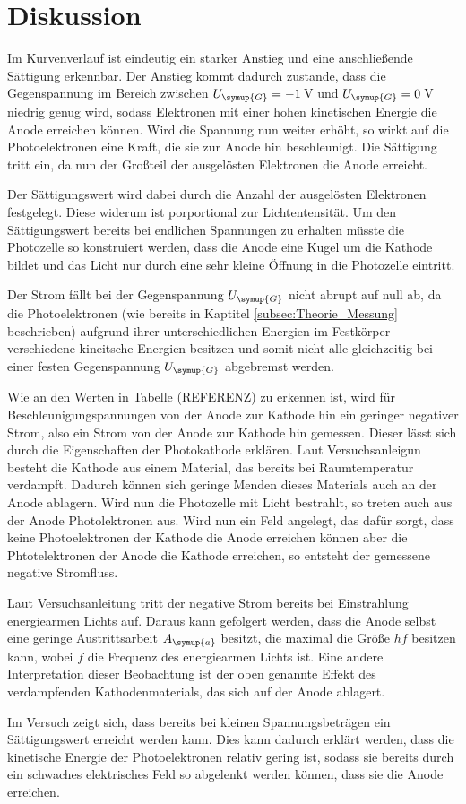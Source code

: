 \section{Diskussion}
\label{sec:Diskussion}

Im Kurvenverlauf ist eindeutig ein starker Anstieg und eine anschließende
Sättigung erkennbar. Der Anstieg kommt dadurch zustande, dass die Gegenspannung
im Bereich zwischen $U_{\symup{G}}=-1\,$V und $U_{\symup{G}}=0\,$V niedrig genug
wird, sodass Elektronen mit einer hohen kinetischen Energie die Anode erreichen
können. Wird die Spannung nun weiter erhöht, so wirkt auf die Photoelektronen
eine Kraft, die sie zur Anode hin beschleunigt. Die Sättigung tritt ein, da
nun der Großteil der ausgelösten Elektronen die Anode erreicht.

Der Sättigungswert wird dabei durch die Anzahl der ausgelösten Elektronen
festgelegt. Diese widerum ist porportional zur Lichtentensität.
Um den Sättigungswert bereits bei endlichen Spannungen zu erhalten müsste die
Photozelle so konstruiert werden, dass die Anode eine Kugel um die Kathode bildet
und das Licht nur durch eine sehr kleine Öffnung in die Photozelle eintritt.

Der Strom fällt bei der Gegenspannung $U_{\symup{G}}$ nicht abrupt auf null ab,
da die Photoelektronen (wie bereits in Kaptitel \ref{subsec:Theorie_Messung}
beschrieben) aufgrund ihrer unterschiedlichen Energien im Festkörper
verschiedene kineitsche Energien besitzen und somit nicht alle gleichzeitig
bei einer festen Gegenspannung $U_{\symup{G}}$ abgebremst werden.

Wie an den Werten in Tabelle (REFERENZ) zu erkennen ist, wird für Beschleunigungspannungen
von der Anode zur Kathode hin ein geringer negativer Strom, also ein Strom von
der Anode zur Kathode hin gemessen. Dieser lässt sich durch die Eigenschaften der
Photokathode erklären. Laut Versuchsanleigun \cite{Versuchsanleitung} besteht die
Kathode aus einem Material, das bereits bei Raumtemperatur verdampft. Dadurch können
sich geringe Menden dieses Materials auch an der Anode ablagern. Wird nun die
Photozelle mit Licht bestrahlt, so treten auch aus der Anode Photolektronen aus.
Wird nun ein Feld angelegt, das dafür sorgt, dass keine Photoelektronen der Kathode
die Anode erreichen können aber die Phtotelektronen der Anode die Kathode erreichen,
so entsteht der gemessene negative Stromfluss.

Laut Versuchsanleitung \cite{Versuchsanleitung} tritt der negative Strom bereits
bei Einstrahlung energiearmen Lichts auf. Daraus kann gefolgert werden, dass die
Anode selbst eine geringe Austrittsarbeit $A_{\symup{a}}$ besitzt, die maximal die
Größe $hf$ besitzen kann, wobei $f$ die Frequenz des energiearmen Lichts ist.
Eine andere Interpretation dieser Beobachtung ist der oben genannte Effekt des
verdampfenden Kathodenmaterials, das sich auf der Anode ablagert.

Im Versuch zeigt sich, dass bereits bei kleinen Spannungsbeträgen ein Sättigungswert
erreicht werden kann. Dies kann dadurch erklärt werden, dass die kinetische Energie
der Photoelektronen relativ gering ist, sodass sie bereits durch ein schwaches
elektrisches Feld so abgelenkt werden können, dass sie die Anode erreichen.
